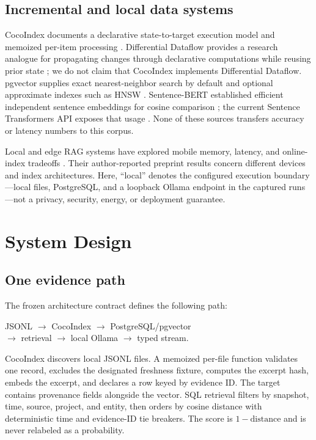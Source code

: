 \documentclass[10pt,twocolumn]{article}
\begin{document}
\subsection{Incremental and local data systems}
CocoIndex documents a declarative state-to-target execution model and memoized per-item processing \cite{cocoindex2026core}.  Differential Dataflow provides a research analogue for propagating changes through declarative computations while reusing prior state \cite{mcsherry2013differential}; we do not claim that CocoIndex implements Differential Dataflow.  pgvector supplies exact nearest-neighbor search by default and optional approximate indexes such as HNSW \cite{pgvector2026,malkov2020hnsw}.  Sentence-BERT established efficient independent sentence embeddings for cosine comparison \cite{reimers2019sbert}; the current Sentence Transformers API exposes that usage \cite{sentenceTransformers2026sts}.  None of these sources transfers accuracy or latency numbers to this corpus.

Local and edge RAG systems have explored mobile memory, latency, and online-index tradeoffs \cite{park2025mobilerag,seemakhupt2024edgerag}.  Their author-reported preprint results concern different devices and index architectures.  Here, ``local'' denotes the configured execution boundary---local files, PostgreSQL, and a loopback Ollama endpoint in the captured runs---not a privacy, security, energy, or deployment guarantee.

\section{System Design}
\subsection{One evidence path}
The frozen architecture contract defines the following path:
\begin{center}
\small
JSONL $\rightarrow$ CocoIndex $\rightarrow$ PostgreSQL/pgvector\\
$\rightarrow$ retrieval $\rightarrow$ local Ollama $\rightarrow$ typed stream.
\end{center}
CocoIndex discovers local JSONL files.  A memoized per-file function validates one record, excludes the designated freshness fixture, computes the excerpt hash, embeds the excerpt, and declares a row keyed by evidence ID.  The target contains provenance fields alongside the vector.  SQL retrieval filters by snapshot, time, source, project, and entity, then orders by cosine distance with deterministic time and evidence-ID tie breakers.  The score is $1-\text{distance}$ and is never relabeled as a probability.
\end{document}
